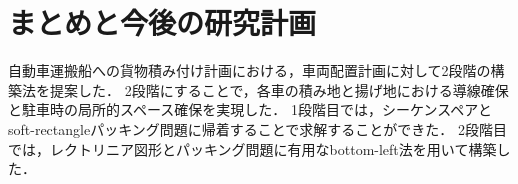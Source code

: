 \chapter{まとめと今後の研究計画}\label{conclution}
自動車運搬船への貨物積み付け計画における，車両配置計画に対して2段階の構築法を提案した．
2段階にすることで，各車の積み地と揚げ地における導線確保と駐車時の局所的スペース確保を実現した．
1段階目では，シーケンスペアとsoft-rectangleパッキング問題に帰着することで求解することができた．
2段階目では，レクトリニア図形とパッキング問題に有用なbottom-left法を用いて構築した．
